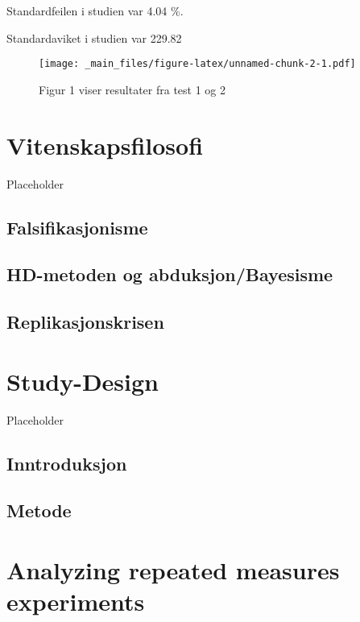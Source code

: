\documentclass[
]{book}
\begin{document}
Standardfeilen i studien var 4.04 \%.

Standardaviket i studien var 229.82

\begin{figure}
\centering
\texttt{[image: \_main\_files/figure-latex/unnamed-chunk-2-1.pdf]}
\caption{\label{fig:unnamed-chunk-2}Figur 1 viser resultater fra test 1 og 2}
\end{figure}

\hypertarget{vitenskapsfilosofi}{%
\chapter{Vitenskapsfilosofi}\label{vitenskapsfilosofi}}

Placeholder

\hypertarget{falsifikasjonisme}{%
\section{Falsifikasjonisme}\label{falsifikasjonisme}}

\hypertarget{hd-metoden-og-abduksjonbayesisme}{%
\section{HD-metoden og abduksjon/Bayesisme}\label{hd-metoden-og-abduksjonbayesisme}}

\hypertarget{replikasjonskrisen}{%
\section{Replikasjonskrisen}\label{replikasjonskrisen}}

\hypertarget{study-design}{%
\chapter{Study-Design}\label{study-design}}

Placeholder

\hypertarget{inntroduksjon}{%
\section{Inntroduksjon}\label{inntroduksjon}}

\hypertarget{metode-1}{%
\section{Metode}\label{metode-1}}

\hypertarget{analyzing-repeated-measures-experiments}{%
\chapter{Analyzing repeated measures experiments}\label{analyzing-repeated-measures-experiments}}
\end{document}
